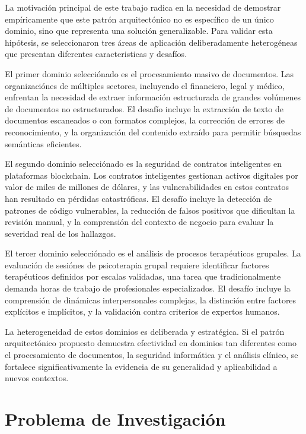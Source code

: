 \documentclass[12pt,a4paper,twoside]{book}
\begin{document}
La motivación principal de este trabajo radica en la necesidad de demostrar empíricamente que este patrón arquitectónico no es específico de un único dominio, sino que representa una solución generalizable. Para validar esta hipótesis, se seleccionaron tres áreas de aplicación deliberadamente heterogéneas que presentan diferentes caracteristicas y desafíos.

El primer dominio selecciónado es el procesamiento masivo de documentos. Las organizaciónes de múltiples sectores, incluyendo el financiero, legal y médico, enfrentan la necesidad de extraer información estructurada de grandes volúmenes de documentos no estructurados. El desafío incluye la extracción de texto de documentos escaneados o con formatos complejos, la corrección de errores de reconocimiento, y la organización del contenido extraído para permitir búsquedas semánticas eficientes.

El segundo dominio selecciónado es la seguridad de contratos inteligentes en plataformas blockchain. Los contratos inteligentes gestionan activos digitales por valor de miles de millones de dólares, y las vulnerabilidades en estos contratos han resultado en pérdidas catastróficas. El desafío incluye la detección de patrones de código vulnerables, la reducción de falsos positivos que dificultan la revisión manual, y la comprensión del contexto de negocio para evaluar la severidad real de los hallazgos.

El tercer dominio selecciónado es el análisis de procesos terapéuticos grupales. La evaluación de sesiónes de psicoterapia grupal requiere identificar factores terapéuticos definidos por escalas validadas, una tarea que tradicionalmente demanda horas de trabajo de profesionales especializados. El desafío incluye la comprensión de dinámicas interpersonales complejas, la distinción entre factores explícitos e implícitos, y la validación contra criterios de expertos humanos.

La heterogeneidad de estos dominios es deliberada y estratégica. Si el patrón arquitectónico propuesto demuestra efectividad en dominios tan diferentes como el procesamiento de documentos, la seguridad informática y el análisis clínico, se fortalece significativamente la evidencia de su generalidad y aplicabilidad a nuevos contextos.

\section{Problema de Investigación}
\end{document}
